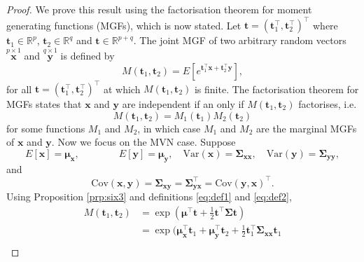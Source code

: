 \documentclass[]{book}
\theoremstyle{definition}
\theoremstyle{definition}
\theoremstyle{definition}
\theoremstyle{remark}
\begin{document}
\begin{proof}
{}We prove this result using the factorisation theorem for moment generating functions (MGFs), which is now stated.
Let \({\boldsymbol t}=({\boldsymbol t}_1^\top , {\boldsymbol t}_2^\top)^\top\) where \({\boldsymbol t}_1 \in \mathbb{R}^p\), \({\boldsymbol t}_2 \in \mathbb{R}^q\) and \({\boldsymbol t}\in \mathbb{R}^{p+q}\). The joint MGF of two arbitrary random vectors \(\stackrel{p \times 1}{\boldsymbol x}\) and \(\stackrel{q \times 1}{\boldsymbol y}\) is defined by
\[
 M({\boldsymbol t}_1, {\boldsymbol t}_2)=E[e^{{\boldsymbol t}_1^\top \boldsymbol x+ {\boldsymbol t}_2^\top \boldsymbol y}],
  \]
for all \({\boldsymbol t}=({\boldsymbol t}_1^\top , {\boldsymbol t}_2^\top )^\top\) at which \(M({\boldsymbol t}_1, {\boldsymbol t}_2)\) is finite.
The factorisation theorem for MGFs states that
\(\boldsymbol x\) and \(\boldsymbol y\) are independent if an only if \(M({\boldsymbol t}_1 , {\boldsymbol t}_2)\) factorises, i.e.
\[
M({\boldsymbol t}_1 , {\boldsymbol t}_2)=M_1({\boldsymbol t}_1)M_2({\boldsymbol t}_2)
\]
for some functions \(M_1\) and \(M_2\), in which case \(M_1\) and \(M_2\) are the marginal MGFs of \(\boldsymbol x\) and \(\boldsymbol y\). Now we focus on the MVN case. Suppose
\begin{equation}
E[\boldsymbol x]=\boldsymbol \mu_{\boldsymbol x}, \qquad \qquad E[\boldsymbol y]=\boldsymbol \mu_{\boldsymbol y}, \quad  \text{Var}(\boldsymbol x)=\boldsymbol \Sigma_{\boldsymbol x\boldsymbol x},
\quad  \text{Var}(\boldsymbol y)=\boldsymbol \Sigma_{\boldsymbol y\boldsymbol y},
\label{eq:def1}
\end{equation}
and
\begin{equation}
\text{Cov}(\boldsymbol x,\boldsymbol y)=\boldsymbol \Sigma_{\boldsymbol x\boldsymbol y}=\boldsymbol \Sigma_{\boldsymbol y\boldsymbol x}^\top = \text{Cov}(\boldsymbol y, \boldsymbol x)^\top.
\label{eq:def2}
\end{equation}
Using Proposition \ref{prp:six3} and definitions \eqref{eq:def1} and \eqref{eq:def2},
\begin{align*}
M({\boldsymbol t}_1, {\boldsymbol t}_2)&=\exp\left ( \boldsymbol \mu^\top {\boldsymbol t}+ \frac{1}{2}{\boldsymbol t}^\top \boldsymbol \Sigma{\boldsymbol t}\right )\\
&=\exp\bigg (\boldsymbol \mu_{\boldsymbol x}^\top {\boldsymbol t}_1 +\boldsymbol \mu_{\boldsymbol y}^\top {\boldsymbol t}_2+\frac{1}{2}{\boldsymbol t}_1^\top \boldsymbol \Sigma_{\boldsymbol x\boldsymbol x}{{\boldsymbol t}_1}\\

\end{align*}
\end{proof}
\end{document}
